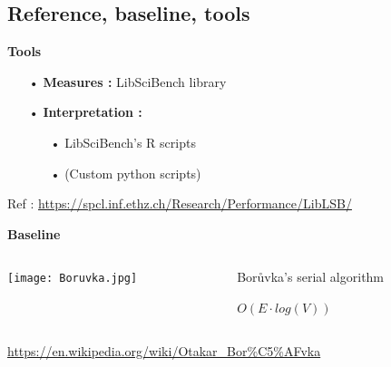 \documentclass{beamer}
\begin{document}
\subsection{Reference, baseline, tools}
\begin{frame}

\textbf{\Large Tools} 

\begin{itemize}
\item[•] \textbf{Measures :} LibSciBench library
\item[•] \textbf{Interpretation :} 
\begin{itemize}
\item[•] LibSciBench's R scripts
\item[•] (Custom python scripts)
\end{itemize}
\end{itemize}

{
\tiny
Ref : 
\url{https://spcl.inf.ethz.ch/Research/Performance/LibLSB/}
}

\vfill

\textbf{\Large Baseline}

\begin{columns}
\begin{column}{0.3\linewidth}
\begin{center}
\texttt{[image: Boruvka.jpg]}
\end{center}
\end{column}
\begin{column}{0.7\linewidth}
\begin{center}
Borůvka's serial algorithm

$O(E \cdot log(V))$
\end{center}
\end{column}
\end{columns}
{\tiny \url{https://en.wikipedia.org/wiki/Otakar_Bor\%C5\%AFvka}}



\end{frame}

\begin{frame}
    \printbibliography
\end{frame} 
\end{document}
